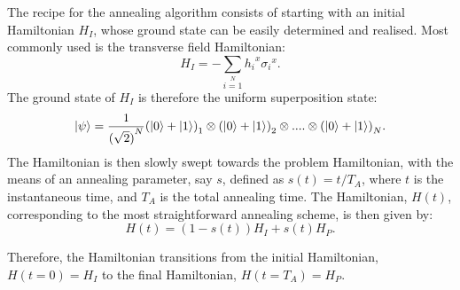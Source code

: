 \documentclass[../main.tex]{subfiles}
\begin{document}
The recipe for the annealing algorithm consists of starting with an initial Hamiltonian $H_I$, whose ground state can be easily determined and realised. Most commonly used is the transverse field Hamiltonian: 
\begin{equation}
H_I=-\sum\limits_{i=1}\limits^{N}{h_i}^x{\sigma_i}^x. \label{eq:b5}
\end{equation}
The ground state of $H_I$ is therefore the uniform superposition state: 
\begin{equation}
\ket{\psi}=\frac{1}{{(\sqrt{2})}^N}{(\ket{0}+\ket{1})}_1 \otimes {(\ket{0}+\ket{1})}_2 \otimes....\otimes{(\ket{0}+\ket{1})}_N. \label{eq:b6}
\end{equation}
The Hamiltonian is then slowly swept towards the problem Hamiltonian, with the means of an annealing parameter, say $s$, defined as $s(t)=t/T_A$, where $t$ is the instantaneous time, and $T_A$ is the total annealing time. The Hamiltonian, $H(t)$, corresponding to the most straightforward annealing scheme, is then given by: 
\begin{equation}
H(t)= (1-s(t))H_I + s(t)H_P. \label{eq:b7}
\end{equation}

Therefore, the Hamiltonian transitions from the initial Hamiltonian, $H(t=0)=H_I$ to the final Hamiltonian, $H(t=T_A)=H_P$. \\
\end{document}
